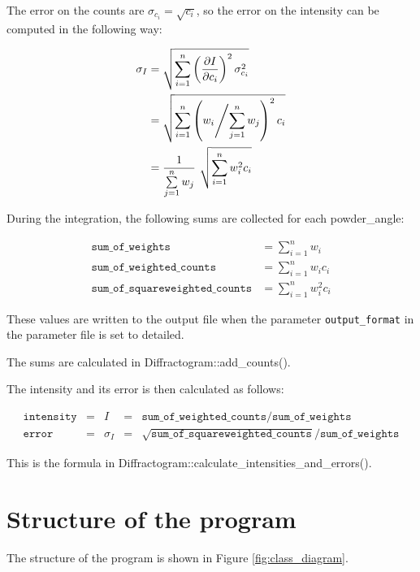\documentclass[a4paper, 12pt, twoside]{scrartcl}
\begin{document}
The error on the counts are $ \sigma_{c_i} = \sqrt{c_i} $, so the error on the intensity can be computed in the following way:

\begin{align*}
	\sigma_I &= \sqrt{\sum\limits_{i=1}^{n} \left(\frac{\partial I}{\partial c_i}\right)^2 \sigma_{c_i}^2} \\
	&= \sqrt{\sum\limits_{i=1}^{n} \left(w_i \middle/ \sum\limits_{j=1}^{n} w_j\right)^2 c_i} \\
	&= \frac{1}{\sum\limits_{j=1}^{n} w_j}~ \sqrt{\sum\limits_{i=1}^{n} w_i^2 c_i}
\end{align*}

During the integration, the following sums are collected for each powder\_angle:

\begin{align*}
	\texttt{sum\_of\_weights} &= \sum\limits_{i=1}^{n} w_i \\
	\texttt{sum\_of\_weighted\_counts} &= \sum\limits_{i=1}^{n} w_i c_i \\
	\texttt{sum\_of\_squareweighted\_counts} &= \sum\limits_{i=1}^{n} w_i^2 c_i
\end{align*}

These values are written to the output file when the parameter \texttt{output\_format} in the parameter file is set to detailed.

The sums are calculated in Diffractogram::add\_counts().

The intensity and its error is then calculated as follows:

\begin{align*}
	\texttt{intensity} &=& I &=& \texttt{sum\_of\_weighted\_counts}\big/\texttt{sum\_of\_weights} \\
	\texttt{error} &=& \sigma_I &=& \sqrt{\texttt{sum\_of\_squareweighted\_counts}}\big/\texttt{sum\_of\_weights}
\end{align*}

This is the formula in Diffractogram::calculate\_intensities\_and\_errors().

\section{Structure of the program}

The structure of the program is shown in Figure \ref{fig:class_diagram}.
\end{document}
